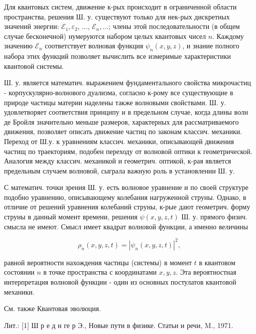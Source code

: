 \documentclass[10pt]{article}
\begin{document}
Для квантовых систем, движение к-рых происходит в ограниченной области пространства, решения Ш. у. существуют только для нек-рых дискретных значений энергии: $\mathscr{E}_{1}, \mathscr{\varepsilon}_{2}$, ..., $\mathscr{E}_{n}, \ldots$; члены этой последовательности (в общем случае бесконечной) нумеруются набором целых квантовых чисел $n$. Каждому значению $\mathscr{E}_{n}$ соответствует волновая функция $\psi_{n}(x, y, z)$, и знание полного набора этих функций позволяет вычислить все измеримые характеристики квантовой системы.



Ш. у. является математич. выражением фундаментального свойства микрочастиц - корпускулярно-волнового дуализма, согласно к-рому все существующие в природе частицы материи наделены также волновыми свойствами. Ш. у. удовлетворяет соответствия принципу и в предельном случае, когда длины волн де Бройля значительно меньше размеров, характерных для рассматриваемого движения, позволяет описать движение частиц по законам классич. механики. Переход от Ш.у. к уравнениям классич. механики, описывающей движения частищ по траекториям, подобен переходу от волновой оптики к геометрической. Аналогия между классич. механикой и геометрич. оптикой, к-рая является предельным случаем волновой, сыграла важную роль в установлении Ш. у.



С математич. точки зрения Ш. у. есть волновое уравнение и по своей структуре подобно уравнению, описывающему колебания нагруженной струны. Однако, в отличие от решений уравнения колебаний струны, к-рые дают геометрич. форму струны в данный момент времени, решения $\psi(x, y, z, t)$ Ш. у. прямого физич. смысла не имеют. Смысл имеет квадрат волновой функции, а именно величины



\[

\rho_{n}(x, y, z, t)=\left|\psi_{n}(x, y, z, t)\right|^{2},

\]



равной вероятности нахождения частицы (системы) в момент $t$ в квантовом состоянии $n$ в точке пространства с координатами $x, y, z$. Эта вероятностная интерпретация волновой функции - один из основных постулатов квантовой механики.



См. также Квантовая эволюция.



Лит.: [1] Ш р е д н ге р Э., Новые пути в физике. Статьи и речи, M., 1971.
\end{document}
